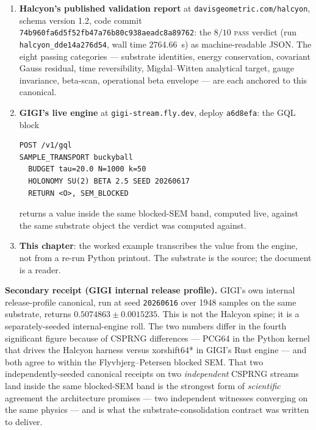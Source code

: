 \documentclass[12pt,a4paper]{article}
\theoremstyle{plain}
\theoremstyle{definition}
\theoremstyle{remark}
\begin{document}
\begin{enumerate}
    \item \textbf{Halcyon's published validation report} at \texttt{davisgeometric.com/halcyon}, schema version 1.2, code commit \texttt{74b960fa6d5f52fb47a76b80c938aeadc8a89762}: the $8/10$ \textsc{pass} verdict (run \texttt{halcyon\_dde14a276d54}, wall time $2764.66$~s) as machine-readable JSON. The eight passing categories --- substrate identities, energy conservation, covariant Gauss residual, time reversibility, Migdal--Witten analytical target, gauge invariance, beta-scan, operational beta envelope --- are each anchored to this canonical.
    \item \textbf{GIGI's live engine} at \texttt{gigi-stream.fly.dev}, deploy \texttt{a6d8efa}: the GQL block
\begin{verbatim}
POST /v1/gql
SAMPLE_TRANSPORT buckyball
  BUDGET tau=20.0 N=1000 k=50
  HOLONOMY SU(2) BETA 2.5 SEED 20260617
  RETURN <O>, SEM_BLOCKED
\end{verbatim}
    returns a value inside the same blocked-SEM band, computed live, against the same substrate object the verdict was computed against.
    \item \textbf{This chapter}: the worked example transcribes the value from the engine, not from a re-run Python printout. The substrate is the source; the document is a reader.
\end{enumerate}

\textbf{Secondary receipt (GIGI internal release profile).} GIGI's own internal release-profile canonical, run at seed \texttt{20260616} over 1948 samples on the same substrate, returns $0.5074863 \pm 0.0015235$. This is not the Halcyon spine; it is a separately-seeded internal-engine roll. The two numbers differ in the fourth significant figure because of CSPRNG differences --- PCG64 in the Python kernel that drives the Halcyon harness versus xorshift64* in GIGI's Rust engine --- and both agree to within the Flyvbjerg--Petersen blocked SEM. That two independently-seeded canonical receipts on two \emph{independent} CSPRNG streams land inside the same blocked-SEM band is the strongest form of \emph{scientific} agreement the architecture promises --- two independent witnesses converging on the same physics --- and is what the substrate-consolidation contract was written to deliver.
\end{document}
